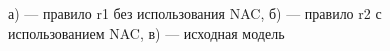 \documentclass[a5paper]{article}
\begin{document}
\begin{figure}[h]
\begin{minipage}[h]{0.49\linewidth}
\end{minipage}
\begin{minipage}[h]{0.49\linewidth}
\end{minipage}
\begin{center}
\begin{minipage}[h]{0.49\linewidth}
\end{minipage}
\end{center}
\caption{а) --- правило r1 без использования NAC, б) — правило r2 с использованием NAC, в) — исходная модель}
\label{fig6}
\end{figure}
\end{document}
